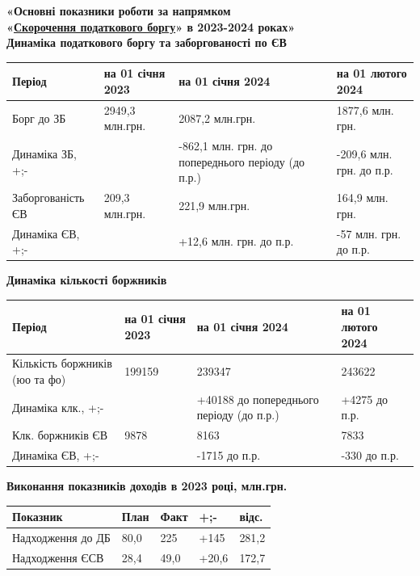 \documentclass[a4paper,14pt]{article}
\begin{document}
\begin{center}

	
\textbf{«Основні показники роботи за напрямком\\ «\underline{Скорочення податкового боргу}» в 2023-2024 роках»}\\
\bigskip
\textbf{Динаміка податкового боргу та заборгованості по ЄВ }\\
\bigskip
\begin{tabular}{||p{3cm}||p{4cm}||p{4cm}||p{4cm}||}
	\hline 	\hline  
	Період & на 01 січня 2023 & на 01 січня 2024 & на 01 лютого 2024 \\ 
	\hline \hline 
	Борг до ЗБ & 2949,3 млн.грн. & 2087,2 млн.грн. & 1877,6 млн. грн. \\ 
	\hline 
	Динаміка ЗБ, +;- &  & -862,1 млн. грн. до попереднього періоду (до п.р.) & -209,6 млн. грн. до п.р. \\ 
	
	\hline \hline
	Заборгованість ЄВ & 209,3 млн.грн. &221,9 млн.грн. & 164,9 млн. грн. \\ 
	\hline
	Динаміка ЄВ, +;- &  & +12,6 млн. грн. до п.р. & -57 млн. грн. до п.р. \\ 
	\hline \hline
\end{tabular} 
\textbf{Динаміка кількості боржників }\\
\bigskip
\begin{tabular}{||p{3cm}||p{4cm}||p{4cm}||p{4cm}||}
	\hline 	\hline  
	Період & на 01 січня 2023 & на 01 січня 2024 & на 01 лютого 2024 \\ 
	\hline \hline 
	Кількість боржників (юо та фо) & 199159 & 239347 & 243622 \\ 
	\hline 
	Динаміка клк., +;- &  & +40188 до попереднього періоду (до п.р.) & +4275 до п.р. \\ 
	
	\hline \hline
	Клк. боржників ЄВ & 9878 &8163 & 7833 \\ 
	\hline
	Динаміка ЄВ, +;- &  & -1715 до п.р. & -330 до п.р. \\ 
	\hline \hline
	
\end{tabular} 
	\textbf{Виконання показників доходів в 2023 році, млн.грн. }\\
	\bigskip
	\begin{tabular}{||p{6cm}||p{2cm}||p{2cm}||p{2cm}||p{2cm}||}
		\hline 	\hline  
		Показник & План & Факт & +;- & відс. \\ 
		\hline \hline 
		Надходження до ДБ & 80,0 & 225 & +145 & 281,2 \\ 
		\hline 
		Надходження ЄСВ & 28,4 & 49,0 & +20,6 & 172,7\\ 
		

\end{tabular}
\end{center}
\end{document}
